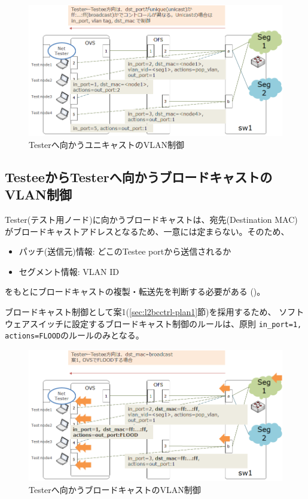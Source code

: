 \begin{figure}[h]
 \centering
 \includegraphics[scale=0.6]{img/vlan-testee2tester.png}
 \caption{Testerへ向かうユニキャストのVLAN制御}
 \label{fig:vlan-testee2tester}
\end{figure}

  \subsection{TesteeからTesterへ向かうブロードキャストのVLAN制御}
  \label{sec:vlan-ctrl-testee2tester-broadcast}

Tester(テスト用ノード)に向かうブロードキャストは、宛先(Destination MAC)
がブロードキャストアドレスとなるため、一意には定まらない。そのため、
\begin{itemize}
 \item パッチ(送信元)情報: どこのTestee portから送信されるか
 \item セグメント情報: VLAN ID
\end{itemize}
をもとにブロードキャストの複製・転送先を判断する必要がある
()。

ブロードキャスト制御として案1(\ref{sec:l2bcctrl-plan1}節)を採用するため、
ソフトウェアスイッチに設定するブロードキャスト制御のルールは、原則
\verb|in_port=1, actions=FLOOD|のルールのみとなる。
\begin{figure}[h]
 \centering
 \includegraphics[scale=0.6]{img/vlan-testee2tester-bcplan1.png}
 \caption{Testerへ向かうブロードキャストのVLAN制御}
 \label{fig:vlan-testee2tester-bcplan1}
\end{figure}

